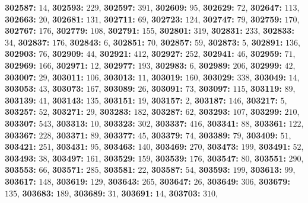 \textsf{\bfseries 302587:} $14$, \textsf{\bfseries 302593:} $229$, \textsf{\bfseries 302597:} $391$, \textsf{\bfseries 302609:} $95$, \textsf{\bfseries 302629:} $72$, \textsf{\bfseries 302647:} $113$, \textsf{\bfseries 302663:} $20$, \textsf{\bfseries 302681:} $131$, \textsf{\bfseries 302711:} $69$, \textsf{\bfseries 302723:} $124$, \textsf{\bfseries 302747:} $79$, \textsf{\bfseries 302759:} $170$, \textsf{\bfseries 302767:} $176$, \textsf{\bfseries 302779:} $108$, \textsf{\bfseries 302791:} $155$, \textsf{\bfseries 302801:} $319$, \textsf{\bfseries 302831:} $233$, \textsf{\bfseries 302833:} $34$, \textsf{\bfseries 302837:} $176$, \textsf{\bfseries 302843:} $6$, \textsf{\bfseries 302851:} $70$, \textsf{\bfseries 302857:} $59$, \textsf{\bfseries 302873:} $5$, \textsf{\bfseries 302891:} $136$, \textsf{\bfseries 302903:} $76$, \textsf{\bfseries 302909:} $44$, \textsf{\bfseries 302921:} $412$, \textsf{\bfseries 302927:} $252$, \textsf{\bfseries 302941:} $46$, \textsf{\bfseries 302959:} $71$, \textsf{\bfseries 302969:} $166$, \textsf{\bfseries 302971:} $12$, \textsf{\bfseries 302977:} $193$, \textsf{\bfseries 302983:} $6$, \textsf{\bfseries 302989:} $206$, \textsf{\bfseries 302999:} $42$, \textsf{\bfseries 303007:} $29$, \textsf{\bfseries 303011:} $106$, \textsf{\bfseries 303013:} $11$, \textsf{\bfseries 303019:} $160$, \textsf{\bfseries 303029:} $338$, \textsf{\bfseries 303049:} $14$, \textsf{\bfseries 303053:} $43$, \textsf{\bfseries 303073:} $167$, \textsf{\bfseries 303089:} $26$, \textsf{\bfseries 303091:} $73$, \textsf{\bfseries 303097:} $115$, \textsf{\bfseries 303119:} $89$, \textsf{\bfseries 303139:} $41$, \textsf{\bfseries 303143:} $135$, \textsf{\bfseries 303151:} $19$, \textsf{\bfseries 303157:} $2$, \textsf{\bfseries 303187:} $146$, \textsf{\bfseries 303217:} $5$, \textsf{\bfseries 303257:} $52$, \textsf{\bfseries 303271:} $29$, \textsf{\bfseries 303283:} $182$, \textsf{\bfseries 303287:} $62$, \textsf{\bfseries 303293:} $107$, \textsf{\bfseries 303299:} $210$, \textsf{\bfseries 303307:} $543$, \textsf{\bfseries 303313:} $10$, \textsf{\bfseries 303323:} $302$, \textsf{\bfseries 303337:} $416$, \textsf{\bfseries 303341:} $88$, \textsf{\bfseries 303361:} $122$, \textsf{\bfseries 303367:} $228$, \textsf{\bfseries 303371:} $89$, \textsf{\bfseries 303377:} $45$, \textsf{\bfseries 303379:} $74$, \textsf{\bfseries 303389:} $79$, \textsf{\bfseries 303409:} $51$, \textsf{\bfseries 303421:} $251$, \textsf{\bfseries 303431:} $95$, \textsf{\bfseries 303463:} $140$, \textsf{\bfseries 303469:} $270$, \textsf{\bfseries 303473:} $199$, \textsf{\bfseries 303491:} $52$, \textsf{\bfseries 303493:} $38$, \textsf{\bfseries 303497:} $161$, \textsf{\bfseries 303529:} $159$, \textsf{\bfseries 303539:} $176$, \textsf{\bfseries 303547:} $80$, \textsf{\bfseries 303551:} $290$, \textsf{\bfseries 303553:} $66$, \textsf{\bfseries 303571:} $285$, \textsf{\bfseries 303581:} $22$, \textsf{\bfseries 303587:} $54$, \textsf{\bfseries 303593:} $199$, \textsf{\bfseries 303613:} $99$, \textsf{\bfseries 303617:} $148$, \textsf{\bfseries 303619:} $129$, \textsf{\bfseries 303643:} $265$, \textsf{\bfseries 303647:} $26$, \textsf{\bfseries 303649:} $306$, \textsf{\bfseries 303679:} $135$, \textsf{\bfseries 303683:} $189$, \textsf{\bfseries 303689:} $31$, \textsf{\bfseries 303691:} $14$, \textsf{\bfseries 303703:} $310$, 
